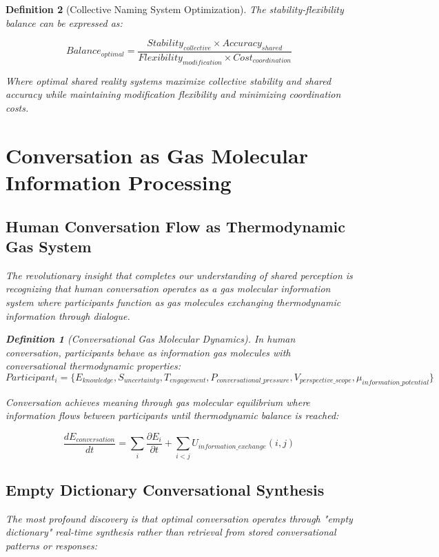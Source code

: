 \documentclass[12pt]{article}
\newtheorem{definition}{Definition}
\begin{document}
\begin{definition}[Collective Naming System Optimization]
The stability-flexibility balance can be expressed as:

$$Balance_{optimal} = \frac{Stability_{collective} \times Accuracy_{shared}}{Flexibility_{modification} \times Cost_{coordination}}$$

Where optimal shared reality systems maximize collective stability and shared accuracy while maintaining modification flexibility and minimizing coordination costs.

\section{Conversation as Gas Molecular Information Processing}

\subsection{Human Conversation Flow as Thermodynamic Gas System}

The revolutionary insight that completes our understanding of shared perception is recognizing that human conversation operates as a gas molecular information system where participants function as gas molecules exchanging thermodynamic information through dialogue.

\begin{definition}[Conversational Gas Molecular Dynamics]
In human conversation, participants behave as information gas molecules with conversational thermodynamic properties:
$$Participant_i = \{E_{knowledge}, S_{uncertainty}, T_{engagement}, P_{conversational\_pressure}, V_{perspective\_scope}, \mu_{information\_potential}\}$$
\end{definition}

Conversation achieves meaning through gas molecular equilibrium where information flows between participants until thermodynamic balance is reached:

$$\frac{dE_{conversation}}{dt} = \sum_i \frac{\partial E_i}{\partial t} + \sum_{i<j} U_{information\_exchange}(i,j)$$

\subsection{Empty Dictionary Conversational Synthesis}

The most profound discovery is that optimal conversation operates through "empty dictionary" real-time synthesis rather than retrieval from stored conversational patterns or responses:


\end{definition}
\end{document}

